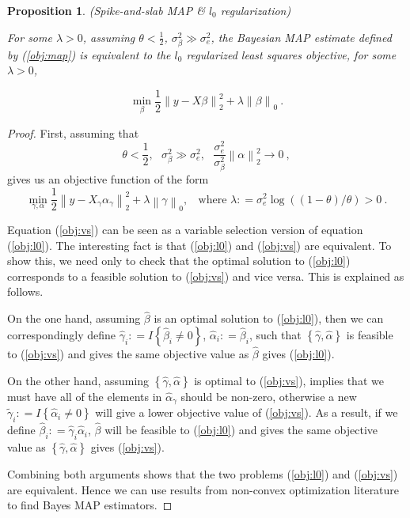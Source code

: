 \documentclass[11pt]{article}%
\newtheorem{proposition}[theorem]{Proposition}
\numberwithin{equation}{section}
\theoremstyle{plain}
\newcommand{\defeq}{\mathrel{\mathop:}=}
\begin{document}
\begin{proposition} (Spike-and-slab MAP \& $l_0$ regularization)

For some $\lambda > 0$, assuming $\theta < \frac12$, $\sigma_\beta^2 \gg \sigma_e^2$, the Bayesian MAP estimate defined by (\ref{obj:map}) is equivalent to the $l_0$ regularized least squares objective, for some $\lambda > 0$,

\begin{equation}
\label{obj:l0}
\min\limits_{\beta}
\frac12\left\|y - X\beta\right\|_2^2
+ \lambda
\left\|\beta\right\|_0 \ .
\end{equation}

\end{proposition}

\begin{proof}  First, assuming that
$$
\theta < \frac12, \ \ \  \sigma_\beta^2 \gg \sigma_e^2, \ \ \  \frac{\sigma_e^2}{\sigma_\beta^2}\left\|\alpha\right\|_2^2 \to 0 \ ,
$$
gives us an objective function of the form
\begin{equation}
\min\limits_{\gamma, \alpha}
\label{obj:vs}
\frac12 \left\|y - X_\gamma \alpha_\gamma\right\|_2^2
+ \lambda
\left\|\gamma\right\|_0,  \ \ \ \  \text{where } \lambda \defeq \sigma_e^2\log\left(\left(1-\theta\right) / \theta\right) > 0 \ .
\end{equation}

Equation (\ref{obj:vs}) can be seen as a variable selection version of equation (\ref{obj:l0}).  The interesting fact is that (\ref{obj:l0}) and (\ref{obj:vs}) are equivalent.  To show this, we need only to check that the optimal solution to (\ref{obj:l0}) corresponds to a feasible solution to (\ref{obj:vs}) and vice versa.  This is explained as follows.

On the one hand, assuming $\hat\beta$ is an optimal solution to (\ref{obj:l0}), then we can correspondingly define $\hat\gamma_i \defeq I\left\{\hat\beta_i \neq 0\right\}$, $\hat\alpha_i \defeq \hat\beta_i$, such that $\left\{\hat\gamma, \hat\alpha\right\}$ is feasible to (\ref{obj:vs}) and gives the same objective value as $\hat\beta$ gives (\ref{obj:l0}).

On the other hand, assuming $\left\{\hat\gamma, \hat\alpha\right\}$ is optimal to (\ref{obj:vs}), implies that we must have all of the elements in $\hat\alpha_\gamma$ should be non-zero, otherwise a new $\tilde\gamma_i \defeq I\left\{\hat\alpha_i \neq 0\right\}$ will give a lower objective value of (\ref{obj:vs}).  As a result, if we define $\hat\beta_i \defeq \hat\gamma_i\hat\alpha_i$, $\hat\beta$ will be feasible to (\ref{obj:l0}) and gives the same objective value as $\left\{\hat\gamma, \hat\alpha\right\}$ gives (\ref{obj:vs}).

Combining both arguments shows that the two problems (\ref{obj:l0}) and (\ref{obj:vs}) are equivalent.  Hence we can use results from non-convex optimization literature to find Bayes MAP estimators.
\end{proof}
\end{document}
